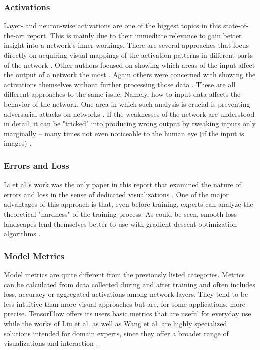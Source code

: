 \documentclass{acmsiggraph}               %
\begin{document}
\subsubsection{Activations}
Layer- and neuron-wise activations are one of the biggest topics in this state-of-the-art report. This is mainly due to their immediate relevance to gain better insight into a network's inner workings.
There are several approaches that focus directly on acquiring visual mappings of the activation patterns in different parts of the network \cite{Yosinski2015,Nguyen2016}. Other authors focused on showing which areas of the input affect the output of a network the most \cite{Samek2017}. Again others were concerned with showing the activations themselves without further processing those data \cite{Liu2018}. These are all different approaches to the same issue. Namely, how to input data affects the behavior of the network. One area in which such analysis is crucial is preventing adversarial attacks on networks \cite{Hohman2018}. If the weaknesses of the network are understood in detail, it can be "tricked" into producing wrong output by tweaking inputs only marginally -- many times not even noticeable to the human eye (if the input is images) \cite{Hohman2018}.
\subsubsection{Errors and Loss}
Li et al.'s work was the only paper in this report that examined the nature of errors and loss in the sense of dedicated visualizations \cite{Li2017}. One of the major advantages of this approach is that, even before training, experts can analyze the theoretical "hardness" of the training process. As could be seen, smooth loss landscapes lend themselves better to use with gradient descent optimization algorithms \cite{Li2017}.
\subsubsection{Model Metrics}
Model metrics are quite different from the previously listed categories. Metrics can be calculated from data collected during and after training and often includes loss, accuracy or aggregated activations among network layers. They tend to be less intuitive than more visual approaches but are, for some applications, more precise. TensorFlow \cite{Wongsuphasawat2018} offers its users basic metrics that are useful for everyday use while the works of Liu et al. as well as Wang et al. are highly specialized solutions intended for domain experts, since they offer a broader range of visualizations and interaction \cite{Liu2016,Liu2018,Wang}.
\end{document}
